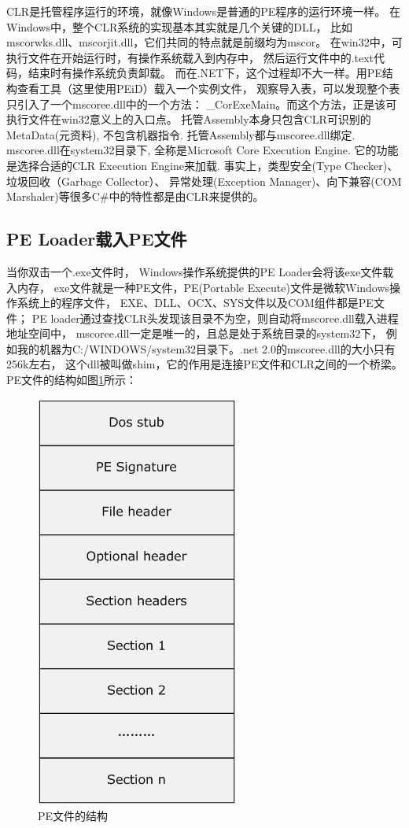\documentclass{book}
\begin{document}
CLR是托管程序运行的环境，就像Windows是普通的PE程序的运行环境一样。
在Windows中，整个CLR系统的实现基本其实就是几个关键的DLL，
比如mscorwks.dll、mscorjit.dll，它们共同的特点就是前缀均为mscor。
在win32中，可执行文件在开始运行时，有操作系统载入到内存中，
然后运行文件中的.text代码，结束时有操作系统负责卸载。
而在.NET下，这个过程却不大一样。用PE结构查看工具（这里使用PEiD）载入一个实例文件，
观察导入表，可以发现整个表只引入了一个mscoree.dll中的一个方法：
\_CorExeMain。而这个方法，正是该可执行文件在win32意义上的入口点。
托管Assembly本身只包含CLR可识别的MetaData(元资料), 
不包含机器指令. 托管Assembly都与mscoree.dll绑定.
mscoree.dll在system32目录下, 全称是Microsoft Core Execution Engine. 
它的功能是选择合适的CLR Execution Engine来加载.
事实上，类型安全(Type Checker)、垃圾回收（Garbage Collector）、
异常处理(Exception Manager)、向下兼容(COM Marshaler)等很多C\#中的特性都是由CLR来提供的。

\subsection{PE Loader载入PE文件}当你双击一个.exe文件时，
Windows操作系统提供的PE Loader会将该exe文件载入内存，
exe文件就是一种PE文件，PE(Portable Execute)文件是微软Windows操作系统上的程序文件，
EXE、DLL、OCX、SYS文件以及COM组件都是PE文件；
PE loader通过查找CLR头发现该目录不为空，则自动将mscoree.dll载入进程地址空间中，
mscoree.dll一定是唯一的，且总是处于系统目录的system32下，
例如我的机器为C:/WINDOWS/system32目录下。.net 2.0的mscoree.dll的大小只有256k左右，
这个dll被叫做shim，它的作用是连接PE文件和CLR之间的一个桥梁。
PE文件的结构如图\ref{fig:PEFileStructure}所示：

\begin{figure}[htbp]
	\centering
	\includegraphics[scale=0.6]{PEFileStructure.jpg}
	\caption{PE文件的结构}
	\label{fig:PEFileStructure}
\end{figure}
\end{document}
